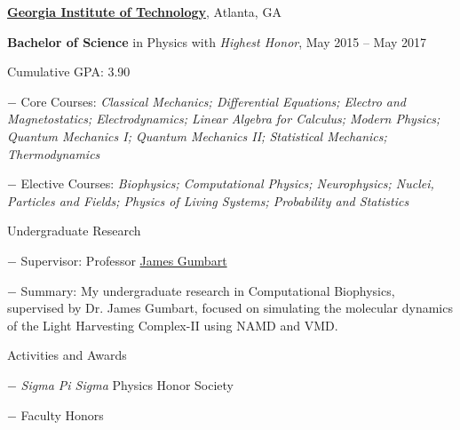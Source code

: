 \documentclass[10pt]{article}
\newcommand{\blankline}{\quad\pagebreak[3]}
\begin{document}
	\href{https://www.gatech.edu/}{\textbf{Georgia Institute of Technology}},
Atlanta, GA
	\begin{outerlist}
		\item[] \textbf{Bachelor of Science} in Physics with \emph{Highest Honor}, May 2015 -- May 2017
		
		\item [] Cumulative GPA: 3.90
\begin{innerlist}
	
	\item [$-$] Core Courses: \emph{Classical Mechanics; Differential Equations; Electro and Magnetostatics; Electrodynamics; Linear Algebra for Calculus; Modern Physics; Quantum Mechanics I; Quantum Mechanics II; Statistical Mechanics; Thermodynamics}
	\item [$-$] Elective Courses: \emph{Biophysics; Computational Physics; Neurophysics; Nuclei, Particles and Fields; Physics of Living Systems; Probability and Statistics}
\end{innerlist}

		\item[] Undergraduate Research
			\begin{innerlist}
				\item[$-$] Supervisor: Professor
					\href{https://physics.gatech.edu/user/james-jc-gumbart}%
	{James Gumbart}
	\item[$-$] Summary: My undergraduate research in Computational Biophysics, supervised by Dr. James Gumbart, focused on simulating the molecular dynamics of the Light Harvesting Complex-II using NAMD and VMD. 

\end{innerlist}

		\item[] Activities and Awards
			\begin{innerlist}
			\item[$-$] \emph{Sigma Pi Sigma} Physics Honor Society
			\item[$-$] Faculty Honors
			\end{innerlist}
	\end{outerlist}

	\blankline
	
\end{document}
